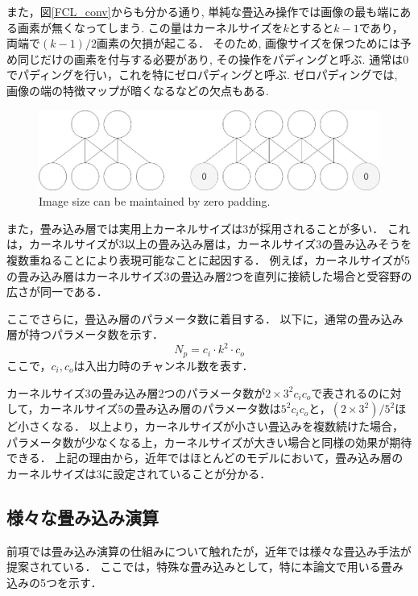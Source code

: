     また，図\ref{FCL_conv}からも分かる通り, 単純な畳込み操作では画像の最も端にある画素が無くなってしまう.
    この量はカーネルサイズを$k$とすると$k-1$であり，両端で$(k-1)/2$画素の欠損が起こる．
    そのため, 画像サイズを保つためには予め同じだけの画素を付与する必要があり, その操作をパディングと呼ぶ.
    通常は0でパディングを行い，これを特にゼロパディングと呼ぶ.
    ゼロパディングでは, 画像の端の特徴マップが暗くなるなどの欠点もある.

    \begin{figure}[ht]
        \begin{center}
            \includegraphics[width=12.0cm]{./8_appendix/img/padding.jpg}
            \caption{Image size can be maintained by zero padding.}
            \label{padding}
        \end{center}
    \end{figure}
    
    また，畳み込み層では実用上カーネルサイズは3が採用されることが多い．
    これは，カーネルサイズが3以上の畳み込み層は，カーネルサイズ3の畳み込みそうを複数重ねることにより表現可能なことに起因する．
    例えば，カーネルサイズが5の畳み込み層はカーネルサイズ3の畳込み層2つを直列に接続した場合と受容野の広さが同一である．

    ここでさらに，畳込み層のパラメータ数に着目する．
    以下に，通常の畳み込み層が持つパラメータ数を示す．
    \begin{equation}
        N_p=c_i\cdot k^2\cdot c_o
    \end{equation}
    ここで，$c_i,c_o$は入出力時のチャンネル数を表す．

    カーネルサイズ3の畳み込み層2つのパラメータ数が$2\times3^2c_i c_o$で表されるのに対して，カーネルサイズ5の畳み込み層のパラメータ数は$5^2c_i c_o$と，$(2\times 3^2)/5^2$ほど小さくなる．
    以上より，カーネルサイズが小さい畳込みを複数続けた場合，パラメータ数が少なくなる上，カーネルサイズが大きい場合と同様の効果が期待できる．
    上記の理由から，近年ではほとんどのモデルにおいて，畳み込み層のカーネルサイズは3に設定されていることが分かる．
    
\subsection{様々な畳み込み演算}
    前項では畳み込み演算の仕組みについて触れたが，近年では様々な畳込み手法が提案されている．
    ここでは，特殊な畳み込みとして，特に本論文で用いる畳み込みの5つを示す．
    
